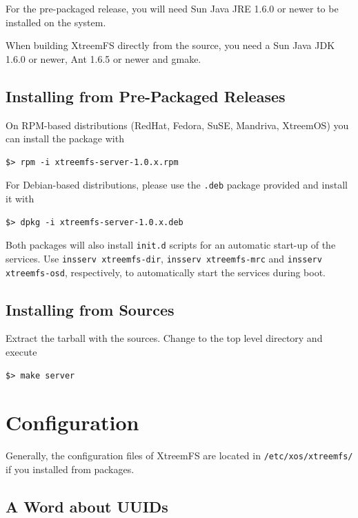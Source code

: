 \documentclass[a4paper,10pt]{book}
\begin{document}
For the pre-packaged release, you will need Sun Java JRE 1.6.0 or newer to be installed on the system.

When building XtreemFS directly from the source, you need a Sun Java JDK 1.6.0 or newer, Ant 1.6.5 or newer and gmake.

\subsection{Installing from Pre-Packaged Releases}

On RPM-based distributions (RedHat, Fedora, SuSE, Mandriva, XtreemOS) you can install the package with


\begin{verbatim}
$> rpm -i xtreemfs-server-1.0.x.rpm
\end{verbatim}


For Debian-based distributions, please use the \texttt{.deb} package provided and install it with


\begin{verbatim}
$> dpkg -i xtreemfs-server-1.0.x.deb
\end{verbatim}


Both packages will also install \texttt{init.d} scripts for an automatic start-up of the services. Use \texttt{insserv xtreemfs-dir}, \texttt{insserv xtreemfs-mrc} and \texttt{insserv xtreemfs-osd}, respectively, to automatically start the services during boot.

\subsection{Installing from Sources}

Extract the tarball with the sources. Change to the top level directory and execute


\begin{verbatim}
$> make server
\end{verbatim}


\section{Configuration}
\label{sec:service_config}

Generally, the configuration files of XtreemFS are located in \texttt{/etc/xos/xtreemfs/} if you installed from packages.


\subsection{A Word about UUIDs}
\end{document}
